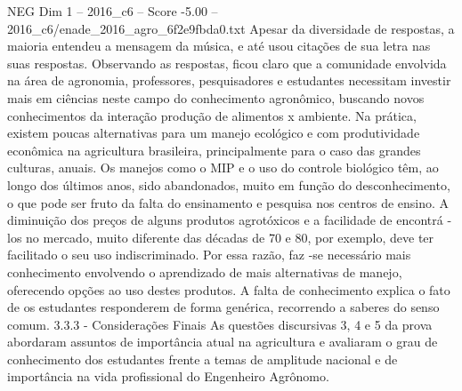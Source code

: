 \begin{textsample}{NEG Dim 1 – 2016\_c6 – Score -5.00 – 2016\_c6/enade\_2016\_agro\_6f2e9fbda0.txt}
Apesar da diversidade de respostas, a maioria entendeu a mensagem da música, e até usou citações de sua letra nas suas respostas.
Observando as respostas, ficou claro que a comunidade envolvida na área de agronomia, professores, pesquisadores e estudantes necessitam investir mais em ciências neste campo do conhecimento agronômico, buscando novos conhecimentos da interação produção de alimentos x ambiente.
Na prática, existem poucas alternativas para um manejo ecológico e com produtividade econômica na agricultura brasileira, principalmente para o caso das grandes culturas, anuais.
Os manejos como o MIP e o uso do controle biológico têm, ao longo dos últimos anos, sido abandonados, muito em função do desconhecimento, o que pode ser fruto da falta do ensinamento e pesquisa nos centros de ensino.
A diminuição dos preços de alguns produtos agrotóxicos e a facilidade de encontrá -los no mercado, muito diferente das décadas de 70 e 80, por exemplo, deve ter facilitado o seu uso indiscriminado.
Por essa razão, faz -se necessário mais conhecimento envolvendo o aprendizado de mais alternativas de manejo, oferecendo opções ao uso destes produtos.
A falta de conhecimento explica o fato de os estudantes responderem de forma genérica, recorrendo a saberes do senso comum. 3.3.3 - Considerações Finais As questões discursivas 3, 4 e 5 da prova abordaram assuntos de importância atual na agricultura e avaliaram o grau de conhecimento dos estudantes frente a temas de amplitude nacional e de importância na vida profissional do Engenheiro Agrônomo.

\end{textsample}
